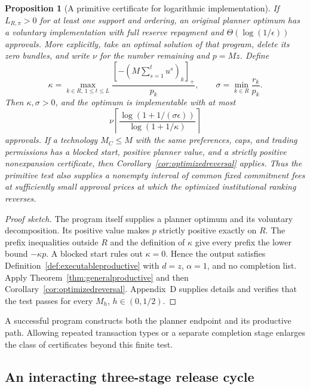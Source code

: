 \documentclass[ecta,draft]{econsocart}
\newtheorem{proposition}[theorem]{Proposition}
\theoremstyle{definition}
\theoremstyle{definition}
\begin{document}
\begin{proposition}[A primitive certificate for logarithmic implementation]
\label{prop:primitiveproductivity}
If $L_{R,\pi}>0$ for at least one support and ordering, an original
planner optimum has a voluntary implementation with full reserve
repayment and $\Theta(\log(1/\epsilon))$ approvals. More explicitly,
take an optimal solution of that program, delete its zero bundles, and
write $\nu$ for the number remaining and $p=Mz$. Define
\[
 \kappa=
 \max_{k\in R,\,1\leq t\leq L}
 \frac{[-(M\sum_{s=1}^t u^s)_k]_+}{p_k},
 \qquad
 \sigma=\min_{k\in R}\frac{r_k}{p_k}.
\]
Then $\kappa,\sigma>0$, and the optimum is implementable with at most
\[
 \nu\left\lceil
 \frac{\log(1+1/(\sigma\epsilon))}{\log(1+1/\kappa)}
 \right\rceil
\]
approvals. If a technology $M_C\leq M$ with the same preferences,
caps, and trading permissions has a blocked start, positive planner
value, and a strictly positive nonexpansion certificate, then
Corollary~\ref{cor:optimizedreversal} applies. Thus the primitive test
also supplies a nonempty interval of common fixed commitment
fees at sufficiently small approval prices at which the optimized institutional ranking reverses.
\end{proposition}

\begin{proof}[Proof sketch]
The program itself supplies a planner optimum and its voluntary
decomposition. Its positive value makes $p$ strictly positive exactly
on $R$. The prefix inequalities outside $R$ and the definition of
$\kappa$ give every prefix the lower bound $-\kappa p$. A blocked
start rules out $\kappa=0$. Hence the output satisfies
Definition~\ref{def:executableproductive} with $d=z$, $\alpha=1$,
and no completion list. Apply Theorem~\ref{thm:generalproductive}
and then Corollary~\ref{cor:optimizedreversal}.
Appendix~D%
 supplies details and verifies
that the test passes for every $M_h$, $h\in(0,1/2)$.
\end{proof}

A successful program constructs both the planner endpoint and its
productive path. Allowing repeated transaction types or a separate completion
stage enlarges the class of certificates beyond this finite test.

\subsection{An interacting three-stage release cycle}
\label{sec:interactingexample}
\end{document}
